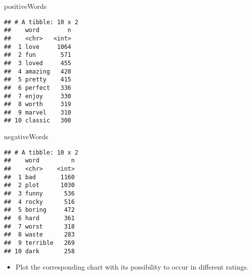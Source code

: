 \documentclass[]{article}
\newenvironment{Shaded}{\begin{snugshade}}{\end{snugshade}}
\newcommand{\KeywordTok}[1]{\textcolor[rgb]{0.13,0.29,0.53}{\textbf{#1}}}
\newcommand{\DataTypeTok}[1]{\textcolor[rgb]{0.13,0.29,0.53}{#1}}
\newcommand{\DecValTok}[1]{\textcolor[rgb]{0.00,0.00,0.81}{#1}}
\newcommand{\StringTok}[1]{\textcolor[rgb]{0.31,0.60,0.02}{#1}}
\newcommand{\OperatorTok}[1]{\textcolor[rgb]{0.81,0.36,0.00}{\textbf{#1}}}
\newcommand{\NormalTok}[1]{#1}
\providecommand{\tightlist}{%
  \setlength{\itemsep}{0pt}\setlength{\parskip}{0pt}}
\begin{document}
\begin{Shaded}
\begin{Highlighting}[]
\NormalTok{positiveWords}
\end{Highlighting}
\end{Shaded}

\begin{verbatim}
## # A tibble: 10 x 2
##    word        n
##    <chr>   <int>
##  1 love     1064
##  2 fun       571
##  3 loved     455
##  4 amazing   420
##  5 pretty    415
##  6 perfect   336
##  7 enjoy     330
##  8 worth     319
##  9 marvel    310
## 10 classic   300
\end{verbatim}

\begin{Shaded}
\begin{Highlighting}[]
\NormalTok{negativeWords}
\end{Highlighting}
\end{Shaded}

\begin{verbatim}
## # A tibble: 10 x 2
##    word         n
##    <chr>    <int>
##  1 bad       1160
##  2 plot      1030
##  3 funny      536
##  4 rocky      516
##  5 boring     472
##  6 hard       361
##  7 worst      318
##  8 waste      283
##  9 terrible   269
## 10 dark       258
\end{verbatim}

\begin{itemize}
\tightlist
\item
  Plot the corresponding chart with its possibility to occur in
  different ratings.
\end{itemize}

\begin{Shaded}
\end{Shaded}
\end{document}
